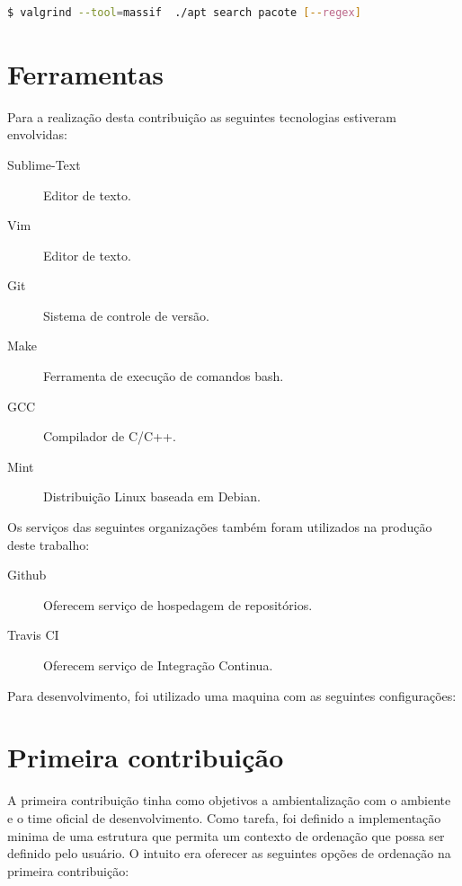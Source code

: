 \begin{lstlisting}[language=Bash,label=valgrind_call, numbers=none]
   $ valgrind --tool=massif  ./apt search pacote [--regex]
\end{lstlisting}


\section{Ferramentas}

Para a realização desta contribuição as seguintes tecnologias estiveram envolvidas:

\begin{description}
	\item[Sublime-Text] Editor de texto.
	\item[Vim] Editor de texto.
	\item[Git] Sistema de controle de versão.
	\item[Make] Ferramenta de execução de comandos {\code bash}.
	\item[GCC] Compilador de C/C++.
	\item[Mint] Distribuição Linux baseada em Debian.
\end{description}

Os serviços das seguintes organizações também foram utilizados na produção deste trabalho:

\begin{description}
	\item[Github] Oferecem serviço de hospedagem de repositórios.
	\item[Travis CI] Oferecem serviço de Integração Continua.
\end{description}

Para desenvolvimento, foi utilizado uma maquina com as seguintes configurações:


\begin{description}
	\item[]
\end{description}


\section{Primeira contribuição} %
\label{sec:primeira_contribui_o}

A primeira contribuição tinha como objetivos a ambientalização com o ambiente e o time oficial de desenvolvimento. Como tarefa, foi definido a implementação minima de uma estrutura que permita um contexto de ordenação que possa ser definido pelo usuário. O intuito era oferecer as seguintes opções de ordenação na primeira contribuição:

